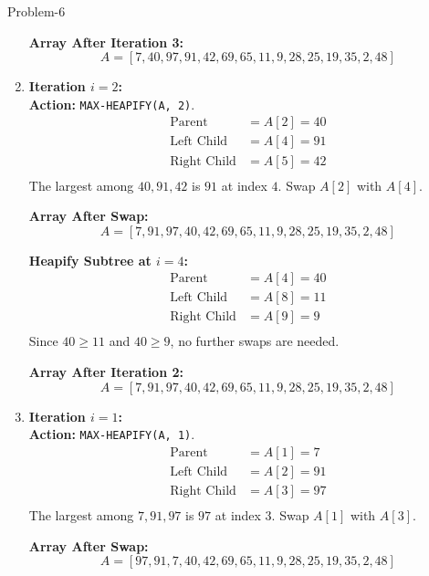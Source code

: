\begin{problem}{}{Problem-6}
\begin{enumerate}[label=(\roman*)]
		\textbf{Array After Iteration 3:}
		\[
		A = [7, 40, 97, 91, 42, 69, 65, 11, 9, 28, 25, 19, 35, 2, 48]
		\]
		
		\item \textbf{Iteration \( i = 2 \):} \\
		\textbf{Action:}  \texttt{MAX-HEAPIFY(A, 2)}. \\
		
		\[
		\begin{aligned}
			\text{Parent} &= A[2] = 40 \\
			\text{Left Child} &= A[4] = 91 \\
			\text{Right Child} &= A[5] = 42 \\
		\end{aligned}
		\]
		The largest among \( 40, 91, 42 \) is \( 91 \) at index \( 4 \). Swap \( A[2] \) with \( A[4] \).
		
		\textbf{Array After Swap:}
		\[
		A = [7, 91, 97, 40, 42, 69, 65, 11, 9, 28, 25, 19, 35, 2, 48]
		\]
		
		\textbf{Heapify Subtree at \( i = 4 \):} \\
		\[
		\begin{aligned}
			\text{Parent} &= A[4] = 40 \\
			\text{Left Child} &= A[8] = 11 \\
			\text{Right Child} &= A[9] = 9 \\
		\end{aligned}
		\]
		Since \( 40 \geq 11 \) and \( 40 \geq 9 \), no further swaps are needed.
		
		\textbf{Array After Iteration 2:}
		\[
		A = [7, 91, 97, 40, 42, 69, 65, 11, 9, 28, 25, 19, 35, 2, 48]
		\]
		
		\item \textbf{Iteration \( i = 1 \):} \\
		\textbf{Action:}  \texttt{MAX-HEAPIFY(A, 1)}. \\
		\[
		\begin{aligned}
			\text{Parent} &= A[1] = 7 \\
			\text{Left Child} &= A[2] = 91 \\
			\text{Right Child} &= A[3] = 97 \\
		\end{aligned}
		\]
		The largest among \( 7, 91, 97 \) is \( 97 \) at index \( 3 \). Swap \( A[1] \) with \( A[3] \).
		
		\textbf{Array After Swap:}
		\[
		A = [97, 91, 7, 40, 42, 69, 65, 11, 9, 28, 25, 19, 35, 2, 48]
		\]
		

\end{enumerate}
\end{problem}
